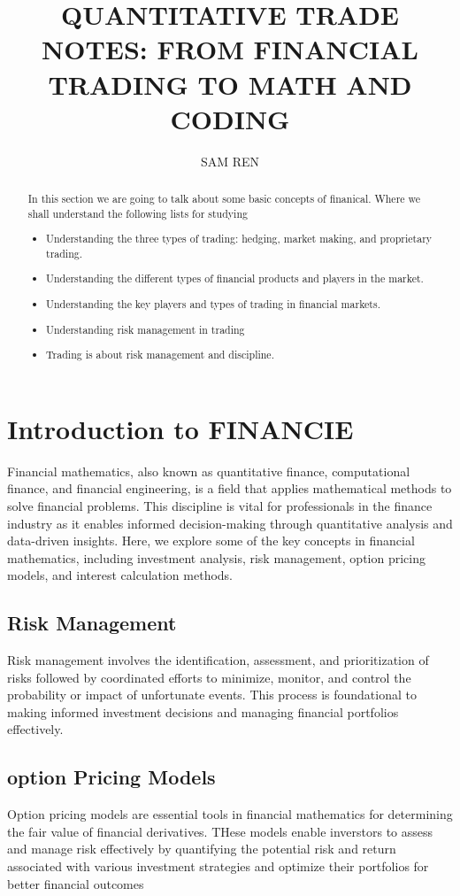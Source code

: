 \documentclass{article}
\title{QUANTITATIVE TRADE NOTES: FROM FINANCIAL TRADING TO MATH AND CODING}
\author{SAM REN}
\theoremstyle{mytheoremstyle}
\theoremstyle{mytheoremstyle}
\theoremstyle{myproblemstyle}
\begin{document}
    \maketitle
  \section{Introduction to FINANCIE} 
\begin{abstract}
 In this section we are going to talk about some basic concepts of finanical. 
 Where we shall understand the following lists for studying
 \begin{itemize}
  \item  Understanding the three types of trading: hedging, market making, and proprietary trading.
  \item Understanding the different types of financial products and players in the market.
  \item Understanding the key players and types of trading in financial markets.
  \item Understanding risk management in trading
  \item Trading is about risk management and discipline.
 \end{itemize}
\end{abstract}

Financial mathematics, also known as quantitative finance, computational finance,
and financial engineering, is a field that applies mathematical methods to solve
financial problems. This discipline is vital for professionals in the finance industry as
it enables informed decision-making through quantitative analysis and data-driven
insights. Here, we explore some of the key concepts in financial mathematics,
including investment analysis, risk management, option pricing models, and interest
calculation methods.

\subsection{Risk Management}
Risk management involves the identification, assessment, and prioritization of risks followed by coordinated efforts to minimize, monitor, and control the probability
or impact of unfortunate events. This process is foundational to making informed investment decisions and managing financial portfolios effectively.

\subsection{option Pricing Models}
Option pricing models are essential tools in financial mathematics for determining the 
fair value of financial derivatives. THese models enable 
inverstors to assess and manage risk effectively by quantifying the 
potential risk and return associated with various investment
strategies and optimize their portfolios for better financial outcomes
\end{document}

